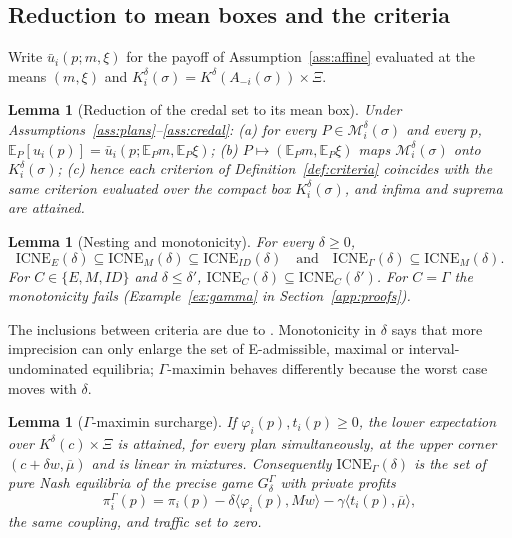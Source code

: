 \documentclass[preprint,11pt]{elsarticle}
\newtheorem{lemma}[theorem]{Lemma}
\theoremstyle{definition}
\theoremstyle{remark}
\newcommand{\E}{\mathbb{E}}
\newcommand{\cM}{\mathcal{M}}
\newcommand{\ub}{\bar u}
\newcommand{\ICNE}{\mathrm{ICNE}}
\newcommand{\ip}[2]{\langle #1,#2\rangle}
\begin{document}
\subsection{Reduction to mean boxes and the criteria}

Write $\ub_i(p;m,\xi)$ for the payoff of Assumption~\ref{ass:affine} evaluated at the means $(m,\xi)$ and $K_i^\delta(\sigma)=K^\delta(A_{-i}(\sigma))\times\Xi$.

\begin{lemma}[Reduction of the credal set to its mean box]\label{lem:reduction}
Under Assumptions~\ref{ass:plans}--\ref{ass:credal}: (a) for every $P\in\cM_i^\delta(\sigma)$ and every $p$, $\E_P[u_i(p)]=\ub_i(p;\E_Pm,\E_P\xi)$; (b) $P\mapsto(\E_Pm,\E_P\xi)$ maps $\cM_i^\delta(\sigma)$ onto $K_i^\delta(\sigma)$; (c) hence each criterion of Definition~\ref{def:criteria} coincides with the same criterion evaluated over the compact box $K_i^\delta(\sigma)$, and infima and suprema are attained.
\end{lemma}

\begin{lemma}[Nesting and monotonicity]\label{lem:nesting}
For every $\delta\ge0$, \[\ICNE_E(\delta)\subseteq\ICNE_M(\delta)\subseteq\ICNE_{ID}(\delta)\quad\text{and}\quad\ICNE_\Gamma(\delta)\subseteq\ICNE_M(\delta).\] For $C\in\{E,M,ID\}$ and $\delta\le\delta'$, $\ICNE_C(\delta)\subseteq\ICNE_C(\delta')$. For $C=\Gamma$ the monotonicity fails (Example~\ref{ex:gamma} in Section~\ref{app:proofs}).
\end{lemma}

The inclusions between criteria are due to \citet{Troffaes2007}. Monotonicity in $\delta$ says that more imprecision can only enlarge the set of E-admissible, maximal or interval-undominated equilibria; $\Gamma$-maximin behaves differently because the worst case moves with $\delta$.

\begin{lemma}[$\Gamma$-maximin surcharge]\label{lem:gamma}
If $\varphi_i(p),t_i(p)\ge0$, the lower expectation over $K^\delta(c)\times\Xi$ is attained, for every plan simultaneously, at the upper corner $(c+\delta w,\overline\mu)$ and is linear in mixtures. Consequently $\ICNE_\Gamma(\delta)$ is the set of pure Nash equilibria of the precise game $G^\Gamma_\delta$ with private profits
\[
\pi_i^\Gamma(p)=\pi_i(p)-\delta\ip{\varphi_i(p)}{Mw}-\gamma\ip{t_i(p)}{\overline\mu},
\]
the same coupling, and traffic set to zero.
\end{lemma}
\end{document}
